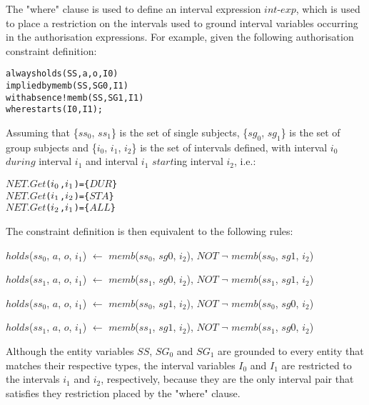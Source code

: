 \documentclass[11pt]{report}
\newenvironment{vverbatim}
{
  \begin{alltt}
}
{
  \vspace{-\baselineskip}
  \end{alltt}
}
\newenvironment{vquote}
{
  \begin{list}{}{\leftmargin 1em}\item[]
}
{
  \end{list}
}
\begin{document}
          The "where" clause is used to define an interval expression
          $int$-$exp$, which is used to place a restriction on the intervals
          used to ground interval variables occurring in the authorisation
          expressions. For example, given the following authorisation
          constraint definition:

          \begin{vverbatim}
  always holds(SS, a, o, I0)
    implied by memb(SS, SG0, I1)
    with absence !memb(SS, SG1, I1)
    where starts(I0, I1);
          \end{vverbatim}

          \noindent
          Assuming that \{$ss_0$, $ss_1$\} is the set of single subjects,
          \{$sg_0$, $sg_1$\} is the set of group subjects and \{$i_0$, $i_1$,
          $i_2$\} is the set of intervals defined, with interval $i_0$ $during$
          interval $i_1$ and interval $i_1$ $start$ing interval $i_2$, i.e.:

          \begin{vverbatim}
  \(NET.Get\)(\(i\sb{0}\), \(i\sb{1}\)) = \{\(DUR\)\}
  \(NET.Get\)(\(i\sb{1}\), \(i\sb{2}\)) = \{\(STA\)\}
  \(NET.Get\)(\(i\sb{2}\), \(i\sb{1}\)) = \{\(ALL\)\}
          \end{vverbatim}

          \noindent
          The constraint definition is then equivalent to the following rules:

          \begin{vquote}
            $holds$($ss_0$, $a$, $o$, $i_1$) $\leftarrow$
              $memb$($ss_0$, $sg0$, $i_2$),
              $NOT$ $\lnot$ $memb$($ss_0$, $sg1$, $i_2$)

            $holds$($ss_1$, $a$, $o$, $i_1$) $\leftarrow$
              $memb$($ss_1$, $sg0$, $i_2$),
              $NOT$ $\lnot$ $memb$($ss_1$, $sg1$, $i_2$)

            $holds$($ss_0$, $a$, $o$, $i_1$) $\leftarrow$
              $memb$($ss_0$, $sg1$, $i_2$),
              $NOT$ $\lnot$ $memb$($ss_0$, $sg0$, $i_2$)

            $holds$($ss_1$, $a$, $o$, $i_1$) $\leftarrow$
              $memb$($ss_1$, $sg1$, $i_2$),
              $NOT$ $\lnot$ $memb$($ss_1$, $sg0$, $i_2$)
          \end{vquote}

          Although the entity variables $SS$, $SG_0$ and $SG_1$ are grounded
          to every entity that matches their respective types, the interval
          variables $I_0$ and $I_1$ are restricted to the intervals $i_1$ and
          $i_2$, respectively, because they are the only interval pair that
          satisfies they restriction placed by the "where" clause.
        
\end{document}
